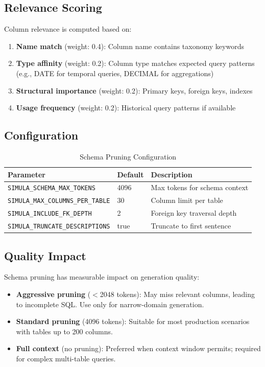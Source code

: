 \documentclass[12pt,a4paper,twoside]{report}
\begin{document}
\subsection{Relevance Scoring}

Column relevance is computed based on:
\begin{enumerate}
\item \textbf{Name match} (weight: 0.4): Column name contains taxonomy keywords
\item \textbf{Type affinity} (weight: 0.2): Column type matches expected query patterns
(e.g., DATE for temporal queries, DECIMAL for aggregations)
\item \textbf{Structural importance} (weight: 0.2): Primary keys, foreign keys, indexes
\item \textbf{Usage frequency} (weight: 0.2): Historical query patterns if available
\end{enumerate}

\subsection{Configuration}

\begin{table}[H]
\centering
\caption{Schema Pruning Configuration}
\label{tab:schema-pruning-config}
\begin{tabular}{lll}
\toprule
\textbf{Parameter} & \textbf{Default} & \textbf{Description} \\
\midrule
\texttt{SIMULA\_SCHEMA\_MAX\_TOKENS} & 4096 & Max tokens for schema context \\
\texttt{SIMULA\_MAX\_COLUMNS\_PER\_TABLE} & 30 & Column limit per table \\
\texttt{SIMULA\_INCLUDE\_FK\_DEPTH} & 2 & Foreign key traversal depth \\
\texttt{SIMULA\_TRUNCATE\_DESCRIPTIONS} & true & Truncate to first sentence \\
\bottomrule
\end{tabular}
\end{table}

\subsection{Quality Impact}

Schema pruning has measurable impact on generation quality:
\begin{itemize}
\item \textbf{Aggressive pruning} ($<$2048 tokens): May miss relevant columns,
leading to incomplete SQL. Use only for narrow-domain generation.
\item \textbf{Standard pruning} (4096 tokens): Suitable for most production
scenarios with tables up to 200 columns.
\item \textbf{Full context} (no pruning): Preferred when context window permits;
required for complex multi-table queries.
\end{itemize}
\end{document}
